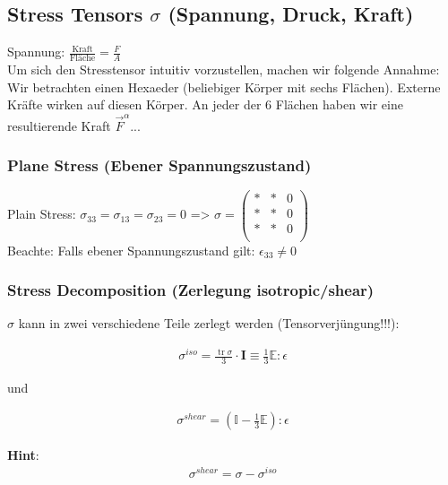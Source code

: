 \documentclass[a4paper]{scrartcl}
\begin{document}
\subsection{Stress Tensors $\sigma$ (Spannung, Druck, Kraft)}
Spannung: $\frac{\text{Kraft}}{\text{Fläche}} = \frac{F}{A}$\\

Um sich den Stresstensor intuitiv vorzustellen, machen wir folgende Annahme:
Wir betrachten einen Hexaeder (beliebiger Körper mit sechs Flächen). Externe
Kräfte wirken auf diesen Körper. An jeder der 6 Flächen haben wir eine
resultierende Kraft $\vec F^\alpha$...

\subsubsection{Plane Stress (Ebener Spannungszustand)}
Plain Stress: $\sigma_{33} = \sigma_{13} = \sigma_{23} = 0$ => $\sigma =
\begin{pmatrix}
* & * & 0\\
* & * & 0\\
* & * & 0\\
\end{pmatrix} $\\

Beachte: Falls ebener Spannungszustand gilt: $\epsilon_{33} \neq 0$\\

\subsubsection{Stress Decomposition (Zerlegung isotropic/shear)}
\label{stressdecomposition}

$\sigma$ kann in zwei verschiedene Teile zerlegt werden (Tensorverjüngung!!!):

\begin{align}
\sigma^{iso}=\frac{\operatorname{tr} \sigma}{3} \cdot \mathbf{I} \equiv
\frac{1}{3} \mathbb{E} : \epsilon
\end{align}

und

\begin{align}
\sigma^{shear}= \left(\mathbb{I}- \frac{1}{3}\mathbb{E} \right) : \epsilon
\end{align}

\textbf{Hint}:
\begin{align}
\sigma^{shear} = \sigma -\sigma^{iso}
\end{align}
\end{document}
